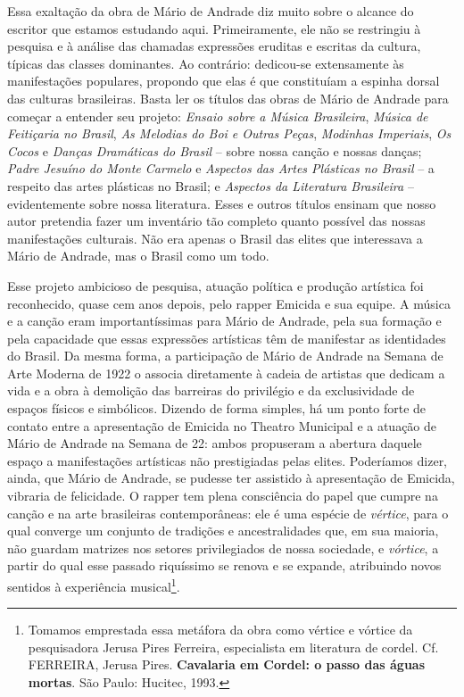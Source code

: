 \documentclass[11pt]{extarticle}
\begin{document}
Essa exaltação da obra de Mário de Andrade diz muito sobre o alcance do
escritor que estamos estudando aqui. Primeiramente, ele não se
restringiu à pesquisa e à análise das chamadas expressões eruditas e
escritas da cultura, típicas das classes dominantes. Ao contrário:
dedicou-se extensamente às manifestações populares, propondo que elas é
que constituíam a espinha dorsal das culturas brasileiras. Basta ler os
títulos das obras de Mário de Andrade para começar a entender seu
projeto: \emph{Ensaio sobre a Música Brasileira}, \emph{Música de
Feitiçaria no Brasil}, \emph{As Melodias do Boi e Outras Peças},
\emph{Modinhas Imperiais}, \emph{Os Cocos} e \emph{Danças Dramáticas do
Brasil} -- sobre nossa canção e nossas danças; \emph{Padre Jesuíno do
Monte Carmelo} e \emph{Aspectos das Artes Plásticas no Brasil} -- a
respeito das artes plásticas no Brasil; e \emph{Aspectos da Literatura
Brasileira} -- evidentemente sobre nossa literatura. Esses e outros
títulos ensinam que nosso autor pretendia fazer um inventário tão
completo quanto possível das nossas manifestações culturais. Não era
apenas o Brasil das elites que interessava a Mário de Andrade, mas o
Brasil como um todo.

Esse projeto ambicioso de pesquisa, atuação política e produção
artística foi reconhecido, quase cem anos depois, pelo rapper Emicida e
sua equipe. A música e a canção eram importantíssimas para Mário de
Andrade, pela sua formação e pela capacidade que essas expressões
artísticas têm de manifestar as identidades do Brasil. Da mesma forma, a
participação de Mário de Andrade na Semana de Arte Moderna de 1922 o
associa diretamente à cadeia de artistas que dedicam a vida e a obra à
demolição das barreiras do privilégio e da exclusividade de espaços
físicos e simbólicos. Dizendo de forma simples, há um ponto forte de
contato entre a apresentação de Emicida no Theatro Municipal e a atuação
de Mário de Andrade na Semana de 22: ambos propuseram a abertura daquele
espaço a manifestações artísticas não prestigiadas pelas elites.
Poderíamos dizer, ainda, que Mário de Andrade, se pudesse ter assistido
à apresentação de Emicida, vibraria de felicidade. O rapper tem plena
consciência do papel que cumpre na canção e na arte brasileiras
contemporâneas: ele é uma espécie de \emph{vértice}, para o qual
converge um conjunto de tradições e ancestralidades que, em sua maioria,
não guardam matrizes nos setores privilegiados de nossa sociedade, e
\emph{vórtice}, a partir do qual esse passado riquíssimo se renova e se
expande, atribuindo novos sentidos à experiência musical\footnote{Tomamos
  emprestada essa metáfora da obra como vértice e vórtice da
  pesquisadora Jerusa Pires Ferreira, especialista em literatura de
  cordel. Cf. FERREIRA, Jerusa Pires. \textbf{Cavalaria em Cordel: o
  passo das águas mortas}. São Paulo: Hucitec, 1993.}.
\end{document}

